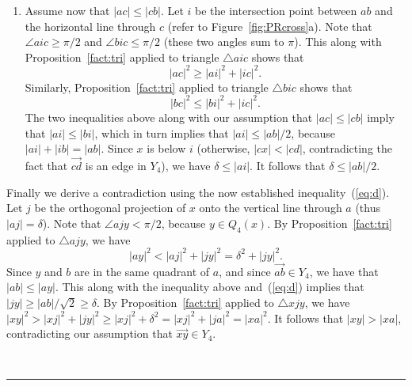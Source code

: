 \pdfoutput=1  \documentclass[11pt]{article}
\newcommand{\qed}{\rule{0.5em}{1.5ex}}
\newcommand{\fqed}{{\hfill~\qed}}
\newenvironment{proof}{{\noindent \bf Proof.}}
                      {{\hfill \fqed} \vspace{1em}}
\begin{document}
\begin{proof}
\begin{enumerate}
\item
Assume now that $|ac| \le |cb|$. Let $i$ be the intersection
point between $ab$ and the horizontal line through $c$
(refer to Figure~\ref{fig:PRcross}a). Note that
$\angle{aic} \ge \pi/2$ and $\angle{bic} \le \pi/2$
(these two angles sum to $\pi$).
This along with
Proposition~\ref{fact:tri}
applied to triangle $\triangle aic$ shows that
\begin{equation*}
 |ac|^2  \ge  |ai|^2 + |ic|^2 .
\end{equation*}
Similarly,
Proposition~\ref{fact:tri}
applied to triangle $\triangle bic$ shows that
\begin{equation*}
|bc|^2 \le |bi|^2 + |ic|^2 .
\end{equation*}
The two inequalities above along with our assumption that $|ac| \le |cb|$
imply that $|ai| \le |bi|$, which in turn implies that $|ai| \le |ab|/2$,
because $|ai|+|ib|=|ab|$. Since $x$ is below $i$ (otherwise, $|cx| < |cd|$,
contradicting the fact that $\overrightarrow{cd}$ is an edge in $Y_4$),
we have $\delta \leq |ai|$. It follows that $\delta \leq |ab|/2$. \end{enumerate}

Finally we derive a contradiction using the now established inequality~(\ref{eq:d}).
Let $j$ be the orthogonal projection of $x$ onto the vertical line through
$a$ (thus $|aj| = \delta$).
Note that $\angle{ajy} < \pi/2$, because $y \in Q_4(x)$.
By
Proposition~\ref{fact:tri}
applied to $\triangle ajy$, we have
\begin{equation*}
 |ay|^2  <  |aj|^2 + |jy|^2 = \delta^2 + |jy|^2 .
\end{equation*}
Since $y$ and $b$ are in the same quadrant of $a$, and since
$\overrightarrow{ab} \in Y_4$, we have that $|ab| \le |ay|$.
This along with the inequality above and~(\ref{eq:d}) implies that
$|jy| \geq |ab|/\sqrt{2} \geq \delta$. By
Proposition~\ref{fact:tri}
applied to $\triangle xjy$,
we have
$|xy|^2 > |xj|^2 + |jy|^2 \geq |xj|^2 + \delta^2 = |xj|^2 + |ja|^2 = |xa|^2$. It
follows that $|xy| > |xa|$, contradicting our assumption that
$\overrightarrow{xy} \in Y_4$.
\end{proof}
\end{document}
